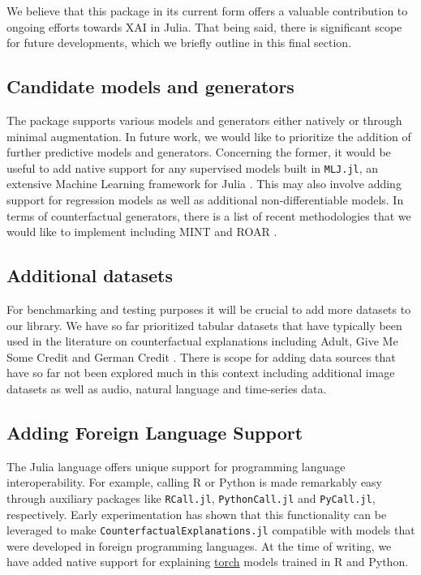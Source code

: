 \documentclass[
  letterpaper,
  DIV=11,
  numbers=noendperiod]{scrartcl}
\begin{document}
We believe that this package in its current form offers a valuable
contribution to ongoing efforts towards XAI in Julia. That being said,
there is significant scope for future developments, which we briefly
outline in this final section.

\hypertarget{candidate-models-and-generators}{%
\subsection{Candidate models and
generators}\label{candidate-models-and-generators}}

The package supports various models and generators either natively or
through minimal augmentation. In future work, we would like to
prioritize the addition of further predictive models and generators.
Concerning the former, it would be useful to add native support for any
supervised models built in \texttt{MLJ.jl}, an extensive Machine
Learning framework for Julia \cite{blaom2020mlj}. This may also involve
adding support for regression models as well as additional
non-differentiable models. In terms of counterfactual generators, there
is a list of recent methodologies that we would like to implement
including MINT \cite{karimi2021algorithmic} and ROAR
\cite{upadhyay2021robust}.

\hypertarget{additional-datasets}{%
\subsection{Additional datasets}\label{additional-datasets}}

For benchmarking and testing purposes it will be crucial to add more
datasets to our library. We have so far prioritized tabular datasets
that have typically been used in the literature on counterfactual
explanations including Adult, Give Me Some Credit and German Credit
\cite{karimi2020survey}. There is scope for adding data sources that
have so far not been explored much in this context including additional
image datasets as well as audio, natural language and time-series data.

\hypertarget{sec-dis-foreign}{%
\subsection{Adding Foreign Language Support}\label{sec-dis-foreign}}

The Julia language offers unique support for programming language
interoperability. For example, calling R or Python is made remarkably
easy through auxiliary packages like \texttt{RCall.jl},
\texttt{PythonCall.jl} and \texttt{PyCall.jl}, respectively. Early
experimentation has shown that this functionality can be leveraged to
make \texttt{CounterfactualExplanations.jl} compatible with models that
were developed in foreign programming languages. At the time of writing,
we have added native support for explaining
\href{https://pytorch.org/}{torch} models trained in R and Python.
\end{document}
